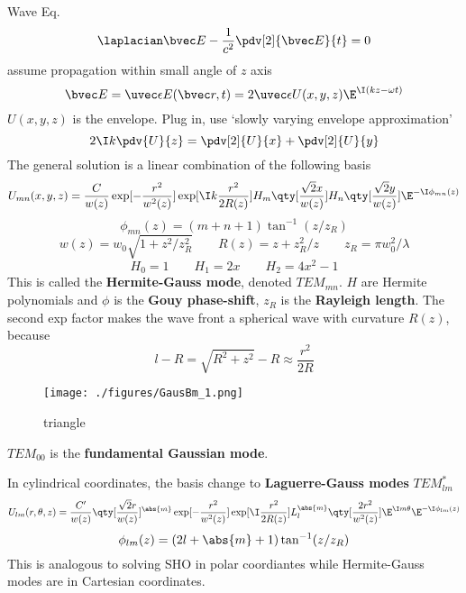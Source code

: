 
\begin{issues}
\issueDraft
\issueMissDepend
{}
\end{issues}

Wave Eq.
\begin{equation}
\laplacian \bvec E - \frac{1}{c^2} \pdv[2]{\bvec E}{t} = 0
\end{equation}
assume propagation within small angle of $z$ axis
\begin{equation}
\bvec E = \uvec \epsilon E(\bvec r, t) = 2\uvec \epsilon U(x, y, z) \E^{\I (kz - \omega t)}
\end{equation}
$U(x, y, z)$ is the envelope. Plug in, use ‘slowly varying envelope approximation’
\begin{equation}
2\I k\pdv{U}{z} = \pdv[2]{U}{x} + \pdv[2]{U}{y}
\end{equation}
The general solution is a linear combination of the following basis
\begin{equation}
U_{mn}(x, y, z) = \frac{C}{w(z)} \exp[-\frac{r^2}{w^2(z)}]\exp[\I k\frac{r^2}{2R(z)}] H_m\qty[\frac{\sqrt{2}x}{w(z)}] H_n \qty[\frac{\sqrt{2} y}{w(z)}] \E^{-\I \phi_{mn}(z)}
\end{equation}
\begin{equation}
\phi_{mn}(z) = (m+n+1)\tan^{-1}(z/z_R)
\end{equation}
\begin{equation}
w(z) = w_0\sqrt{1 + z^2/z_R^2}
\qquad
R(z) = z + z_R^2 / z
\qquad
z_R = \pi w_0^2 / \lambda
\end{equation}
\begin{equation}
H_0 = 1 \qquad H_1 = 2x \qquad H_2 = 4x^2 - 1
\end{equation}
This is called the \textbf{Hermite-Gauss mode}, denoted $TEM_{mn}$. $H$ are Hermite polynomials and $\phi$ is the \textbf{Gouy phase-shift}, $z_R$ is the \textbf{Rayleigh length}. The second exp factor makes the wave front a spherical wave with curvature $R(z)$, because
\begin{equation}
l - R = \sqrt{R^2 + z^2} - R \approx \frac{r^2}{2R}
\end{equation}

\begin{figure}[ht]
\centering
\texttt{[image: ./figures/GausBm\_1.png]}
\caption{triangle} \label{GausBm_fig1}
\end{figure}

$TEM_{00}$ is the \textbf{fundamental Gaussian mode}.

In cylindrical coordinates, the basis change to \textbf{Laguerre-Gauss modes} $TEM_{lm}^*$
\begin{equation}
U_{lm}(r, \theta, z) = \frac{C'}{w(z)} \qty[\frac{\sqrt{2}r}{w(z)}]^{\abs{m}} \exp[-\frac{r^2}{w^2(z)}] \exp[\I \frac{r^2}{2R(z)}] L_l^{\abs{m}} \qty[\frac{2r^2}{w^2(z)}] \E^{\I m\theta} \E^{-\I \phi_{lm}(z)}
\end{equation}
\begin{equation}
\phi_{lm}(z) = (2l + \abs{m} + 1) \tan^{-1} (z/z_R)
\end{equation}
This is analogous to solving SHO in polar coordiantes while Hermite-Gauss modes are in Cartesian coordinates. 
